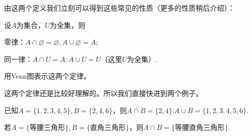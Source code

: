 \documentclass[lang=cn,math=cm,chinesefont=nofont,11pt,scheme=chinese,twocol]{elegantbook}
\begin{document}
由这两个定义我们立刻可以得到这些常见的性质（更多的性质稍后介绍）：

设$A$为集合，$U$为全集，则
\begin{property}
  零律：$A\cap\varnothing =\varnothing,A\cup\varnothing=A$;
\end{property}
\begin{property}
  同一律：$A\cap U=A;A\cup U=U$（这里$U$为全集）.
\end{property}

\begin{exercise}\label{exer:10}
  用Venn图表示这两个定律。
\end{exercise}


这两个定律还是比较好理解的。所以我们直接快进到两个例子。

\begin{example}
  已知$A=\{1,2,3,4,5\},B=\{2,4,6\}$，则$A\cap B=\{2,4\}$,$A\cup B=\{1,2,3,4,5,6\}$.
\end{example}

\begin{example}
  若$A=\{\text{等腰三角形}\},B=\{\text{直角三角形}\}$，则$A\cap B=\{\text{等腰直角三角形}\}.$
\end{example}
\end{document}
